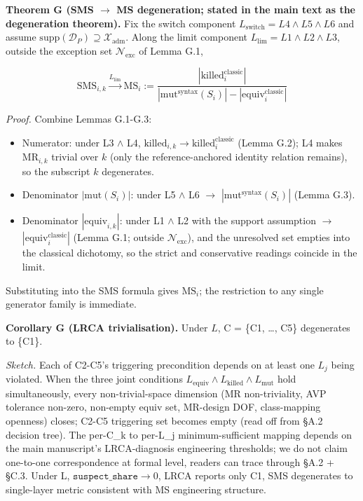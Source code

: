 \documentclass[review,12pt,authoryear]{elsarticle}
\providecommand{\tightlist}{\setlength{\itemsep}{0pt}\setlength{\parskip}{0pt}}
\begin{document}
\textbf{Theorem G (SMS $\to$ MS degeneration; stated in the main text
as the degeneration theorem).} Fix the switch component
$L_{\mathrm{switch}} = L4 \wedge L5 \wedge L6$ and assume
$\mathrm{supp}(\mathcal{D}_P) \supseteq \mathcal{X}_{\mathrm{adm}}$.
Along the limit component $L_{\mathrm{lim}} = L1 \wedge L2 \wedge L3$,
outside the exception set $\mathcal{N}_{\mathrm{exc}}$ of Lemma G.1,

\[ \mathrm{SMS}_{i,k} \xrightarrow{L_{\mathrm{lim}}} \mathrm{MS}_{i} := \frac{|\mathrm{killed}_{i}^{\mathrm{classic}}|}{|\mathrm{mut}^{\mathrm{syntax}}(S_i)| - |\mathrm{equiv}_{i}^{\mathrm{classic}}|} \]

\emph{Proof.} Combine Lemmas G.1-G.3:

\begin{itemize}
\tightlist
\item
  Numerator: under L3 $\wedge$ L4, $\mathrm{killed}_{i,k} \to
  \mathrm{killed}_{i}^{\mathrm{classic}}$ (Lemma G.2); L4 makes $\mathrm{MR}_{i,k}$ trivial
  over $k$ (only the reference-anchored identity relation remains), so
  the subscript $k$ degenerates.
\item
  Denominator $|\mathrm{mut}(S_i)|$: under L5 $\wedge$ L6 $\to$
  $|\mathrm{mut}^{\mathrm{syntax}}(S_i)|$ (Lemma G.3).
\item
  Denominator $|\mathrm{equiv}_{i,k}|$: under L1 $\wedge$ L2 with the
  support assumption $\to$
  $|\mathrm{equiv}_{i}^{\mathrm{classic}}|$ (Lemma G.1;
  outside $\mathcal{N}_{\mathrm{exc}}$), and the unresolved set empties
  into the classical dichotomy, so the strict and conservative readings
  coincide in the limit.
\end{itemize}

Substituting into the SMS formula gives $\mathrm{MS}_{i}$; the
restriction to any single generator family is immediate.

\textbf{Corollary G (LRCA trivialisation).} Under $L$, C
= \{C1, \ldots, C5\} degenerates to \{C1\}.

\emph{Sketch.} Each of C2-C5's triggering precondition depends on at
least one $L_j$ being violated. When the three joint conditions
$L_{\mathrm{equiv}} \wedge L_{\mathrm{killed}} \wedge L_{\mathrm{mut}}$
hold simultaneously,
every non-trivial-space dimension (MR non-triviality, AVP tolerance
non-zero, non-empty equiv set, MR-design DOF, class-mapping openness)
closes; C2-C5 triggering set becomes empty (read off from §A.2 decision
tree). The per-C\_k to per-L\_j minimum-sufficient mapping depends on
the main manuscript's LRCA-diagnosis engineering thresholds; we do not claim one-to-one
correspondence at formal level, readers can trace through §A.2 + §C.3.
Under L, $\texttt{suspect\_share} \to 0$, LRCA reports only C1, SMS degenerates to
single-layer metric consistent with \citet{d7c38286734419b52de4262c9802ebdfcf4b9447} MS engineering
structure.
\end{document}
